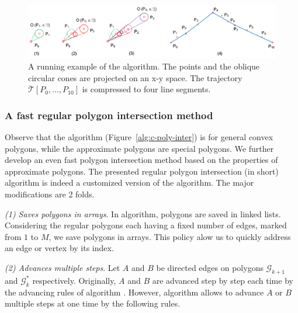 \begin{figure}[tb!]
\centering
\includegraphics[scale=0.8]{figures/Fig-ex-conest.png}
\vspace{-1ex}
\caption{\small A running example of the \cist algorithm. The points and the oblique circular cones are projected on an x-y space. The trajectory $\dddot{\mathcal{T}}[P_0, \ldots, P_{10}]$ is compressed to four line segments.}
\vspace{-2ex}
\label{fig:exm-const}
\end{figure}



\subsubsection{A fast regular polygon intersection method}


Observe that the \cpia algorithm (Figure~\ref{alg:c-poly-inter}) is for general convex polygons, while the approximate polygons are special polygons. We further develop an even fast polygon intersection method based on the properties of approximate polygons.
%
The presented regular polygon intersection (\rpia in short) algorithm is indeed a customized version of the \cpia algorithm.
The major modifications are 2 folds.

\ni \emph{{(1) Saves polygons in arrays}}.
In \cpia algorithm, polygons are saved in linked lists.
Considering the regular polygons each having a fixed number of edges, marked from $1$ to $M$, we save polygons in arrays. This policy alow us to quickly address an edge or vertex by its index.


\ni \emph{(2) Advances multiple steps}.
Let $A$ and $B$ be directed edges on polygons $\mathcal{G}_{k+1}$ and $\mathcal{G}^*_k$ respectively.
Originally, $A$ and $B$ are advanced step by step each time by the advancing rules of algorithm \cpia .
%
However, algorithm \rpia allows to advance $A$ or $B$ multiple steps at one time by the following rules.

